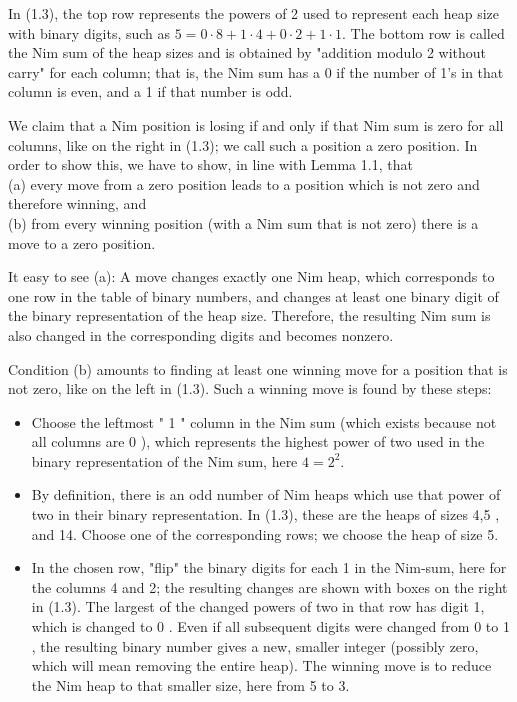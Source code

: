 \documentclass[12pt]{article}
\begin{document}
In (1.3), the top row represents the powers of 2 used to represent each heap size with binary digits, such as $5=0 \cdot 8+1 \cdot 4+0 \cdot 2+1 \cdot 1$. The bottom row is called the Nim sum of the heap sizes and is obtained by "addition modulo 2 without carry" for each column; that is, the Nim sum has a 0 if the number of 1's in that column is even, and a 1 if that number is odd.

We claim that a Nim position is losing if and only if that Nim sum is zero for all columns, like on the right in (1.3); we call such a position a zero position. In order to show this, we have to show, in line with Lemma 1.1, that\\
(a) every move from a zero position leads to a position which is not zero and therefore winning, and\\
(b) from every winning position (with a Nim sum that is not zero) there is a move to a zero position.

It easy to see (a): A move changes exactly one Nim heap, which corresponds to one row in the table of binary numbers, and changes at least one binary digit of\\
the binary representation of the heap size. Therefore, the resulting Nim sum is also changed in the corresponding digits and becomes nonzero.

Condition (b) amounts to finding at least one winning move for a position that is not zero, like on the left in (1.3). Such a winning move is found by these steps:

\begin{itemize}
  \item Choose the leftmost " 1 " column in the Nim sum (which exists because not all columns are 0 ), which represents the highest power of two used in the binary representation of the Nim sum, here $4=2^{2}$.
  \item By definition, there is an odd number of Nim heaps which use that power of two in their binary representation. In (1.3), these are the heaps of sizes 4,5 , and 14. Choose one of the corresponding rows; we choose the heap of size 5.
  \item In the chosen row, "flip" the binary digits for each 1 in the Nim-sum, here for the columns 4 and 2; the resulting changes are shown with boxes on the right in (1.3). The largest of the changed powers of two in that row has digit 1, which is changed to 0 . Even if all subsequent digits were changed from 0 to 1 , the resulting binary number gives a new, smaller integer (possibly zero, which will mean removing the entire heap). The winning move is to reduce the Nim heap to that smaller size, here from 5 to 3.
\end{itemize}
\end{document}
